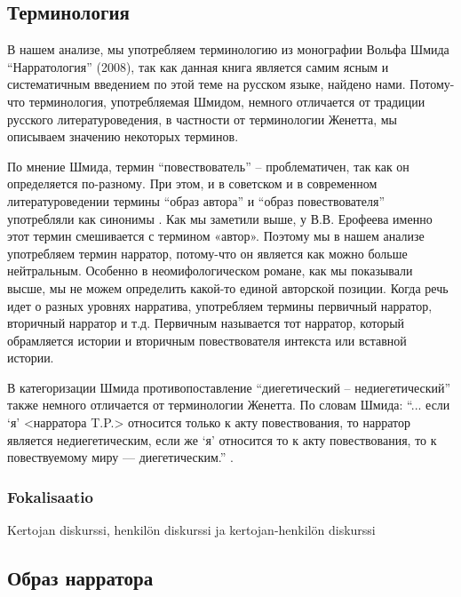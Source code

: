 \documentclass[12pt,a4paper]{article}
\begin{document}
\subsection{Терминология}

В нашем анализе, мы употребляем терминологию из монографии Вольфа Шмида \enquote{Нарратология} (2008), так как данная книга является самим ясным и систематичным введением по этой теме на русском языке, найдено нами. Потому-что терминология, употребляемая Шмидом, немного отличается от традиции русского литературоведения, в частности от терминологии Женетта, мы описываем значению некоторых терминов.
  
По мнение Шмида, термин \enquote{повествователь} -- проблематичен, так как он
определяется по-разному. При этом, и в советском и в современном
литературоведении термины \enquote{образ автора} и \enquote{образ повествователя} употребляли как
синонимы \parencite[67--68]{schmid2008}.  Как мы заметили выше, у В.В.
Ерофеева именно этот термин смешивается с термином «автор». Поэтому мы в нашем анализе
употребляем термин нарратор, потому-что он является как можно больше
нейтральным. Особенно в неомифологическом романе, как мы показывали высше, мы не можем определить какой-то единой авторской позиции.  Когда речь идет о разных уровнях нарратива, употребляем термины
первичный нарратор, вторичный нарратор и т.д. Первичным называется тот нарратор,
который  обрамляется истории и вторичным повествователя интекста или вставной истории.

В категоризации Шмида противопоставление \enquote{диегетический -- недиегетический} также немного отличается от терминологии Женетта. По словам Шмида: \enquote{... если \enquote{я} <нарратора T.P.> относится только к акту повествования, то нарратор является недиегетическим, если же \enquote{я} относится то к акту повествования, то к повествуемому миру — диегетическим.} \parencite[84]{schmid2008}.

\subsubsection{Fokalisaatio}
Kertojan diskurssi, henkilön diskurssi ja kertojan-henkilön diskurssi

\subsection{Образ нарратора}
\end{document}
